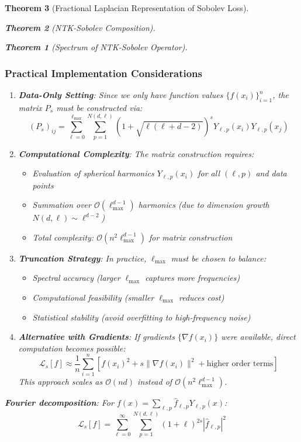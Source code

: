 \documentclass{article}
\newtheorem{theorem}{Theorem}[section]
\begin{document}
\begin{theorem}[Fractional Laplacian Representation of Sobolev Loss]
\begin{theorem}[NTK-Sobolev Composition]
\begin{theorem}[Spectrum of NTK-Sobolev Operator]
\subsubsection{Practical Implementation Considerations}

\begin{enumerate}
\item \textbf{Data-Only Setting}: Since we only have function values $\{f(x_i)\}_{i=1}^n$, the matrix $P_s$ must be constructed via:
\[ (P_s)_{ij} = \sum_{\ell=0}^{\ell_{\max}} \sum_{p=1}^{N(d,\ell)} (1 + \sqrt{\ell(\ell + d - 2)})^s Y_{\ell,p}(x_i) Y_{\ell,p}(x_j) \]

\item \textbf{Computational Complexity}: The matrix construction requires:
\begin{itemize}
\item Evaluation of spherical harmonics $Y_{\ell,p}(x_i)$ for all $(\ell,p)$ and data points
\item Summation over $\mathcal{O}(\ell_{\max}^{d-1})$ harmonics (due to dimension growth $N(d,\ell) \sim \ell^{d-2}$)
\item Total complexity: $\mathcal{O}(n^2 \ell_{\max}^{d-1})$ for matrix construction
\end{itemize}

\item \textbf{Truncation Strategy}: In practice, $\ell_{\max}$ must be chosen to balance:
\begin{itemize}
\item Spectral accuracy (larger $\ell_{\max}$ captures more frequencies)
\item Computational feasibility (smaller $\ell_{\max}$ reduces cost)
\item Statistical stability (avoid overfitting to high-frequency noise)
\end{itemize}

\item \textbf{Alternative with Gradients}: If gradients $\{\nabla f(x_i)\}$ were available, direct computation becomes possible:
\[ \mathcal{L}_s[f] \approx \frac{1}{n}\sum_{i=1}^n \left[ f(x_i)^2 + s \|\nabla f(x_i)\|^2 + \text{higher order terms} \right] \]
This approach scales as $\mathcal{O}(nd)$ instead of $\mathcal{O}(n^2\ell_{\max}^{d-1})$.
\end{enumerate}

\textbf{Fourier decomposition}: For $f(x) = \sum_{\ell,p} \hat{f}_{\ell,p} Y_{\ell,p}(x)$:
\[ \mathcal{L}_s[f] = \sum_{\ell=0}^{\infty} \sum_{p=1}^{N(d,\ell)} (1+\ell)^{2s} |\hat{f}_{\ell,p}|^2 \]


\end{theorem}
\end{theorem}
\end{theorem}
\end{document}
